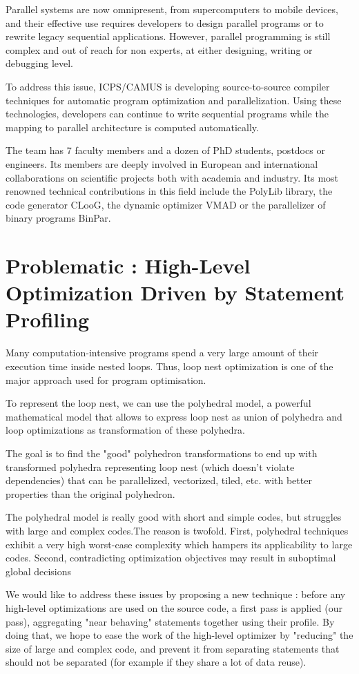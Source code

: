 \documentclass[paper=a4, fontsize=11.5pt]{scrartcl}
\numberwithin{equation}{section}        %
\numberwithin{figure}{section}          %
\numberwithin{table}{section}               %
\begin{document}
Parallel systems are now omnipresent, from supercomputers to mobile devices,
and their effective use requires developers to design parallel programs or to rewrite
legacy sequential applications. However, parallel programming is still complex and out
of reach for non experts, at either designing, writing or debugging level.

To address this issue, ICPS/CAMUS is developing source-to-source compiler techniques
for automatic program optimization and parallelization. Using these technologies,
developers can continue to write sequential programs while the mapping to parallel
architecture is computed automatically.

The team has 7 faculty members and a dozen of PhD students,
postdocs or engineers. Its members are deeply involved in European and international
collaborations on scientific projects both with academia and industry.
Its most renowned technical contributions in this field include
the PolyLib library, the code generator CLooG, the dynamic optimizer VMAD or the parallelizer
of binary programs BinPar.


\section{Problematic : High-Level Optimization Driven by Statement Profiling}
Many computation-intensive programs spend a very large amount of their execution
time inside nested loops. Thus, loop nest optimization is one of the major approach used
for program optimisation.

To represent the loop nest, we can use the polyhedral model, a powerful mathematical model
that allows to express loop nest as union of polyhedra and loop optimizations as
transformation of these polyhedra.

The goal is to find the "good" polyhedron transformations to end up with
transformed polyhedra representing loop nest (which doesn't violate dependencies) 
that can be parallelized, vectorized, tiled, etc. with better properties than the original
polyhedron.

The polyhedral model is really good with short and simple codes, but struggles with
large and complex codes.The reason is twofold. First, polyhedral techniques exhibit
a very high worst-case complexity which hampers its applicability to large codes.
Second, contradicting optimization objectives may result in suboptimal global
decisions


We would like to address these issues by proposing a new technique : before any
high-level optimizations are used on the source code, a first pass is applied (our pass),
aggregating "near behaving" statements together using their profile.
By doing that, we hope to ease the work of the high-level optimizer by "reducing" the size
of large and complex code, and prevent it from separating statements that should
not be separated (for example if they share a lot of data reuse).
\end{document}

